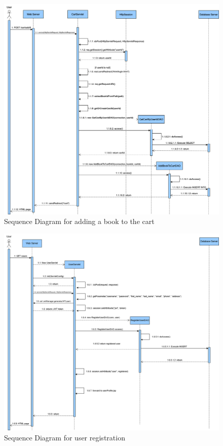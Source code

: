 \clearpage
\begin{figure}[h!]
    \centering
    \includegraphics[width=\textwidth]{photos/SequenceDiagram_CartServlet_AddBookToCart.png}
    \caption{Sequence Diagram for adding a book to the cart}
    \label{fig:addtocartsequencediagram}
\end{figure}

\clearpage
\begin{figure}[h!]
    \centering
    \includegraphics[width=\textwidth]{photos/registeruser-sequence-diagram.png}
    \caption{Sequence Diagram for user registration}
    \label{fig:registerusersequencediagram}
\end{figure}
